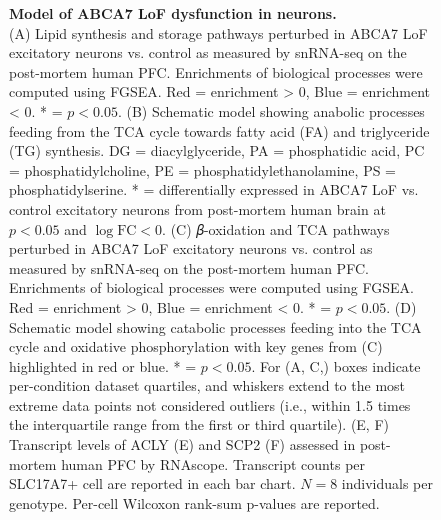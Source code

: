 \begin{figure}[ht]
    \caption{
        \textbf{Model of ABCA7 LoF dysfunction in neurons.}\\[1ex]
        (A) Lipid synthesis and storage pathways perturbed in ABCA7 LoF excitatory neurons vs. control as measured by snRNA-seq on the post-mortem human PFC. Enrichments of biological processes were computed using FGSEA. Red = enrichment > 0, Blue = enrichment < 0. * = $p<0.05$. 
        (B) Schematic model showing anabolic processes feeding from the TCA cycle towards fatty acid (FA) and triglyceride (TG) synthesis. DG = diacylglyceride, PA = phosphatidic acid, PC = phosphatidylcholine, PE = phosphatidylethanolamine, PS = phosphatidylserine. * = differentially expressed in ABCA7 LoF vs. control excitatory neurons from post-mortem human brain at $p<0.05$ and $\log\text{FC}<0$. 
        (C) 𝛽-oxidation and TCA pathways perturbed in ABCA7 LoF excitatory neurons vs. control as measured by snRNA-seq on the post-mortem human PFC. Enrichments of biological processes were computed using FGSEA. Red = enrichment > 0, Blue = enrichment < 0. * = $p<0.05$. 
        (D) Schematic model showing catabolic processes feeding into the TCA cycle and oxidative phosphorylation with key genes from (C) highlighted in red or blue. * = $p<0.05$. For (A, C,) boxes indicate per-condition dataset quartiles, and whiskers extend to the most extreme data points not considered outliers (i.e., within 1.5 times the interquartile range from the first or third quartile). 
        (E, F) Transcript levels of ACLY (E) and SCP2 (F) assessed in post-mortem human PFC by RNAscope. Transcript counts per SLC17A7+ cell are reported in each bar chart. $N = 8$ individuals per genotype. Per-cell Wilcoxon rank-sum p-values are reported.
    }
    \label{fig:lipid_mitochondrial_perturbations}
\end{figure}